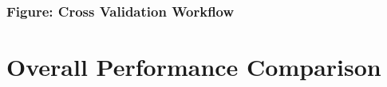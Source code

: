 \documentclass[letterpaper]{article}
\begin{document}
\par
\subsubsection[Figure: Cross Validation Workflow]{\textbf{Figure:} Cross Validation Workflow}

\bigskip


\bigskip


\bigskip


\bigskip


\bigskip


\bigskip


\bigskip


\bigskip

\section[Overall Performance Comparison]{\textbf{Overall Performance Comparison}}

\bigskip
\end{document}
